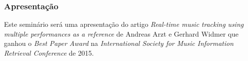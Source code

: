 \begin{frame}
  \frametitle{Apresentação}
  Este seminário será uma apresentação do artigo \emph{Real-time music tracking using multiple performances as a reference} de Andreas Arzt e Gerhard Widmer que ganhou o \emph{Best Paper Award} na  \emph{International Society for Music Information Retrieval Conference} de 2015.
\end{frame}
